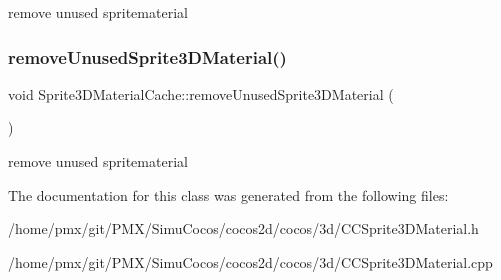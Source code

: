 remove unused spritematerial \mbox{\label{classSprite3DMaterialCache_a144c544a18b5483de07a2d8444d063df}} 
\subsubsection{\texorpdfstring{remove\+Unused\+Sprite3\+D\+Material()}{removeUnusedSprite3DMaterial()}\hspace{0.1cm}{\footnotesize\ttfamily [2/2]}}
{\footnotesize\ttfamily void Sprite3\+D\+Material\+Cache\+::remove\+Unused\+Sprite3\+D\+Material (\begin{DoxyParamCaption}{ }\end{DoxyParamCaption})}

remove unused spritematerial 

The documentation for this class was generated from the following files\+:\begin{DoxyCompactItemize}
\item 
/home/pmx/git/\+P\+M\+X/\+Simu\+Cocos/cocos2d/cocos/3d/C\+C\+Sprite3\+D\+Material.\+h\item 
/home/pmx/git/\+P\+M\+X/\+Simu\+Cocos/cocos2d/cocos/3d/C\+C\+Sprite3\+D\+Material.\+cpp\end{DoxyCompactItemize}
